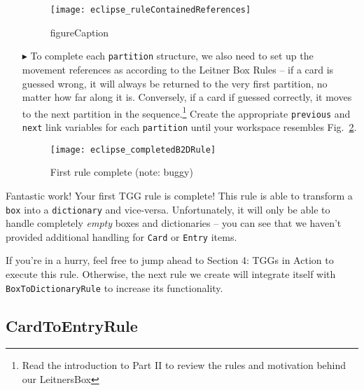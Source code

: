 \begin{itemize}
\begin{figure}[htbp]
\begin{center}
  \texttt{[image: eclipse\_ruleContainedReferences]}
  \caption{figureCaption}
  \label{fig:firstReferences}
\end{center}
\end{figure}

\item[$\blacktriangleright$] To complete each \texttt{partition} structure, we also need to set up the movement references as according to the Leitner Box
Rules -- if a card is guessed wrong, it will always be returned to the very first partition, no matter how far along it is. Conversely, if a card if guessed
correctly, it moves to the next partition in the sequence.\footnote{Read the introduction to Part II to review the rules and motivation behind our LeitnersBox}
Create the appropriate \texttt{previous} and \texttt{next} link variables for each \texttt{partition} until your workspace resembles
Fig.~\ref{fig:allReferences}.

\begin{figure}[htbp]
\begin{center}
  \texttt{[image: eclipse\_completedB2DRule]}
  \caption{First rule complete (note: buggy)}
  \label{fig:allReferences}
\end{center}
\end{figure}

\end{itemize}

Fantastic work! Your first TGG rule is complete! This rule is able to transform a \texttt{box} into a \texttt{dictionary} and vice-versa. Unfortunately, it will
only be able to handle completely \emph{empty} boxes and dictionaries -- you can see that we haven't provided additional handling for \texttt{Card} or
\texttt{Entry} items.

If you're in a hurry, feel free to jump ahead to Section 4: TGGs in Action to execute this rule. Otherwise, the next rule we create will integrate itself with
\texttt{BoxToDictionaryRule} to increase its functionality. 

\subsection{CardToEntryRule}


